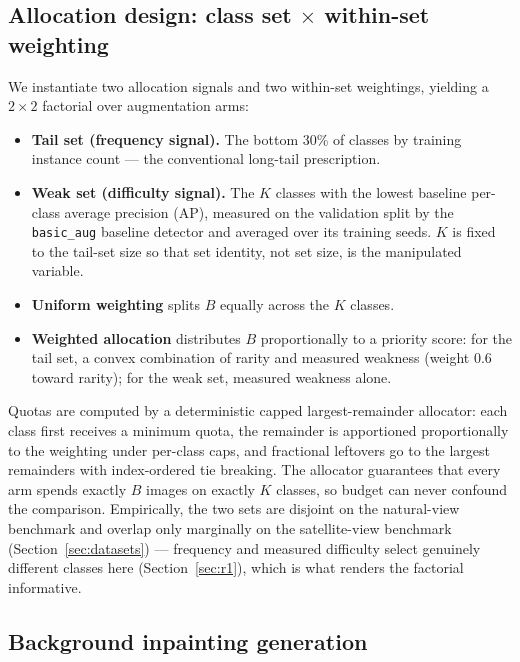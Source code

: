 \documentclass[preprint,12pt,authoryear]{elsarticle}
\begin{document}
\subsection{Allocation design: class set $\times$ within-set weighting}\label{sec:alloc}

We instantiate two allocation signals and two within-set weightings,
yielding a $2\times2$ factorial over augmentation arms:
\begin{itemize}
\item \textbf{Tail set (frequency signal).} The bottom 30\% of classes
  by training instance count --- the conventional long-tail
  prescription.
\item \textbf{Weak set (difficulty signal).} The $K$ classes with the
  lowest baseline per-class average precision (AP), measured on the
  validation split by the \texttt{basic\_aug} baseline detector and
  averaged over its training seeds. $K$ is fixed to the tail-set size so
  that set identity, not set size, is the manipulated variable.
\item \textbf{Uniform weighting} splits $B$ equally across the $K$
  classes.
\item \textbf{Weighted allocation} distributes $B$ proportionally to a
  priority score: for the tail set, a convex combination of rarity and
  measured weakness (weight 0.6 toward rarity); for the weak set,
  measured weakness alone.
\end{itemize}

Quotas are computed by a deterministic capped largest-remainder
allocator: each class first receives a minimum quota, the remainder is
apportioned proportionally to the weighting under per-class caps, and
fractional leftovers go to the largest remainders with index-ordered tie
breaking. The allocator guarantees that every arm spends exactly $B$
images on exactly $K$ classes, so budget can never confound the
comparison. Empirically, the two sets are disjoint on the natural-view
benchmark and overlap only marginally on the satellite-view benchmark
(Section~\ref{sec:datasets}) --- frequency and measured difficulty
select genuinely different classes here (Section~\ref{sec:r1}), which is
what renders the factorial informative.

\subsection{Background inpainting generation}\label{sec:generation}
\end{document}
